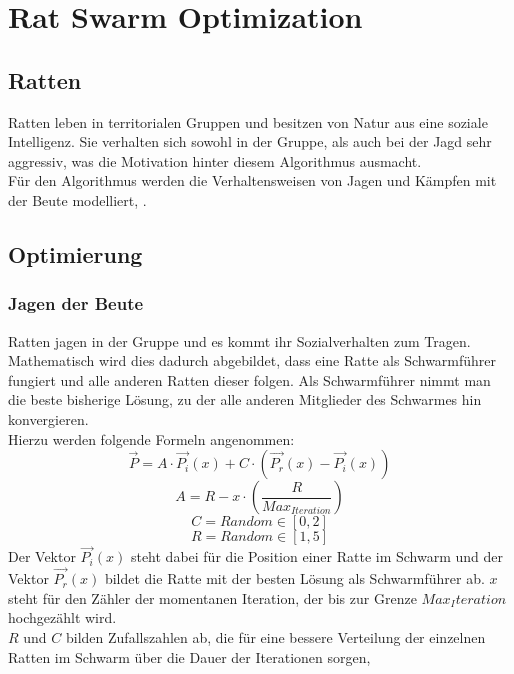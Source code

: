 \chapter{Rat Swarm Optimization}

\section{Ratten}
Ratten leben in territorialen Gruppen und besitzen von Natur aus eine soziale Intelligenz. Sie verhalten sich sowohl in der Gruppe, als auch bei der Jagd sehr aggressiv, was die Motivation hinter diesem Algorithmus ausmacht.\\
Für den Algorithmus werden die Verhaltensweisen von Jagen und Kämpfen mit der Beute modelliert, \cite[vgl. Gaurav Dhiman, S.2f]{dhiman_garg_nagar_kumar_dehghani_2020}.

\section{Optimierung}
\subsection{Jagen der Beute}
Ratten jagen in der Gruppe und es kommt ihr Sozialverhalten zum Tragen. Mathematisch wird dies dadurch abgebildet, dass eine Ratte als Schwarmführer fungiert und alle anderen Ratten dieser folgen. Als Schwarmführer nimmt man die beste bisherige Lösung, zu der alle anderen Mitglieder des Schwarmes hin konvergieren. \\
Hierzu werden folgende Formeln angenommen: 
\begin{equation}
    \vec{P} = A \cdot \vec{P_i}(x) + C \cdot (\vec{P_r}(x) - \vec{P_i}(x))
    \label{calcP}
\end{equation}
\begin{equation}
    A = R-x \cdot (\frac{R}{Max_{Iteration}})
    \label{calcA}
\end{equation}
\begin{equation}
    C = Random \in [0,2]
    \label{calcC}
\end{equation}
\begin{equation}
    R = Random \in [1,5]
    \label{calcR}
\end{equation}
Der Vektor $\vec{P_i}(x)$ steht dabei für die Position einer Ratte im Schwarm und der Vektor $\vec{P_r}(x)$ bildet die Ratte mit der besten Lösung als Schwarmführer ab. $x$ steht für den Zähler der momentanen Iteration, der bis zur Grenze $Max_Iteration$ hochgezählt wird. \\
$R$ und $C$ bilden Zufallszahlen ab, die für eine bessere Verteilung der einzelnen Ratten im Schwarm über die Dauer der Iterationen sorgen, \cite[vgl. Gaurav Dhiman, S.3]{dhiman_garg_nagar_kumar_dehghani_2020}

